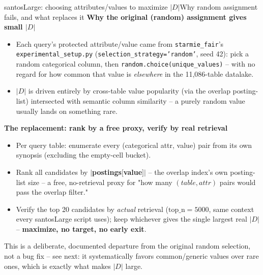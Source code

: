 \documentclass[aspectratio=169,10pt]{beamer}
\newcommand{\highlight}[1]{{\color{Cat1}\bfseries #1}}
\begin{document}
\begin{frame}{santosLarge: choosing attributes/values to maximize $|D|$}{Why random assignment fails, and what replaces it}
\textbf{Why the original (random) assignment gives small $|D|$}
\begin{itemize}\small
  \item Each query's protected attribute/value came from \texttt{starmie\_fair}'s \texttt{experimental\_setup.py} (\texttt{selection\_strategy='random'}, seed 42): pick a random categorical column, then \texttt{random.choice(unique\_values)} -- with no regard for how common that value is \emph{elsewhere} in the 11{,}086-table datalake.
  \item $|D|$ is driven entirely by cross-table value popularity (via the overlap posting-list) intersected with semantic column similarity -- a purely random value usually lands on something rare.
\end{itemize}
\vspace{4pt}
\textbf{The replacement: rank by a free proxy, verify by real retrieval}
\begin{itemize}\small
  \item Per query table: enumerate every (categorical attr, value) pair from its own synopsis (excluding the empty-cell bucket).
  \item Rank all candidates by \highlight{$|$postings$[$value$]|$} -- the overlap index's own posting-list size -- a free, no-retrieval proxy for "how many $(table,attr)$ pairs would pass the overlap filter."
  \item Verify the top 20 candidates by \emph{actual} retrieval ($\mathrm{top\_n}{=}5000$, same context every santosLarge script uses); keep whichever gives the single largest real $|D|$ -- \highlight{maximize, no target, no early exit}.
\end{itemize}
\vspace{4pt}
{\footnotesize\color{Muted} This is a deliberate, documented departure from the original random selection, not a bug fix -- see next: it systematically favors common/generic values over rare ones, which is exactly what makes $|D|$ large.}
\end{frame}
\end{document}
